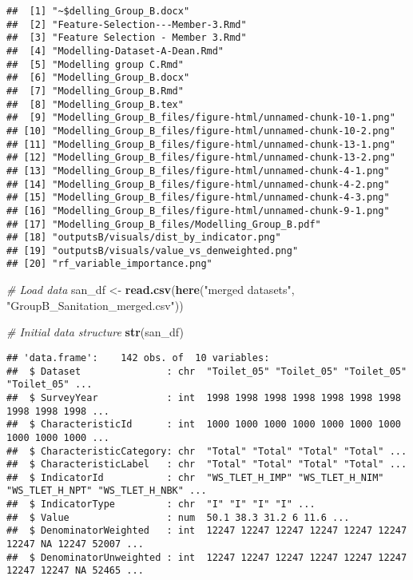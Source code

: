 \documentclass[
]{article}
\newenvironment{Shaded}{\begin{snugshade}}{\end{snugshade}}
\newcommand{\CommentTok}[1]{\textcolor[rgb]{0.56,0.35,0.01}{\textit{#1}}}
\newcommand{\FunctionTok}[1]{\textcolor[rgb]{0.13,0.29,0.53}{\textbf{#1}}}
\newcommand{\NormalTok}[1]{#1}
\newcommand{\OtherTok}[1]{\textcolor[rgb]{0.56,0.35,0.01}{#1}}
\newcommand{\StringTok}[1]{\textcolor[rgb]{0.31,0.60,0.02}{#1}}
\begin{document}
\begin{verbatim}
##  [1] "~$delling_Group_B.docx"                                    
##  [2] "Feature-Selection---Member-3.Rmd"                          
##  [3] "Feature Selection - Member 3.Rmd"                          
##  [4] "Modelling-Dataset-A-Dean.Rmd"                              
##  [5] "Modelling group C.Rmd"                                     
##  [6] "Modelling_Group_B.docx"                                    
##  [7] "Modelling_Group_B.Rmd"                                     
##  [8] "Modelling_Group_B.tex"                                     
##  [9] "Modelling_Group_B_files/figure-html/unnamed-chunk-10-1.png"
## [10] "Modelling_Group_B_files/figure-html/unnamed-chunk-10-2.png"
## [11] "Modelling_Group_B_files/figure-html/unnamed-chunk-13-1.png"
## [12] "Modelling_Group_B_files/figure-html/unnamed-chunk-13-2.png"
## [13] "Modelling_Group_B_files/figure-html/unnamed-chunk-4-1.png" 
## [14] "Modelling_Group_B_files/figure-html/unnamed-chunk-4-2.png" 
## [15] "Modelling_Group_B_files/figure-html/unnamed-chunk-4-3.png" 
## [16] "Modelling_Group_B_files/figure-html/unnamed-chunk-9-1.png" 
## [17] "Modelling_Group_B_files/Modelling_Group_B.pdf"             
## [18] "outputsB/visuals/dist_by_indicator.png"                    
## [19] "outputsB/visuals/value_vs_denweighted.png"                 
## [20] "rf_variable_importance.png"
\end{verbatim}

\begin{Shaded}
\begin{Highlighting}[]
\CommentTok{\# Load data}
\NormalTok{san\_df }\OtherTok{\textless{}{-}} \FunctionTok{read.csv}\NormalTok{(}\FunctionTok{here}\NormalTok{(}\StringTok{"merged datasets"}\NormalTok{, }\StringTok{"GroupB\_Sanitation\_merged.csv"}\NormalTok{))}

\CommentTok{\# Initial data structure}
\FunctionTok{str}\NormalTok{(san\_df)}
\end{Highlighting}
\end{Shaded}

\begin{verbatim}
## 'data.frame':    142 obs. of  10 variables:
##  $ Dataset               : chr  "Toilet_05" "Toilet_05" "Toilet_05" "Toilet_05" ...
##  $ SurveyYear            : int  1998 1998 1998 1998 1998 1998 1998 1998 1998 1998 ...
##  $ CharacteristicId      : int  1000 1000 1000 1000 1000 1000 1000 1000 1000 1000 ...
##  $ CharacteristicCategory: chr  "Total" "Total" "Total" "Total" ...
##  $ CharacteristicLabel   : chr  "Total" "Total" "Total" "Total" ...
##  $ IndicatorId           : chr  "WS_TLET_H_IMP" "WS_TLET_H_NIM" "WS_TLET_H_NPT" "WS_TLET_H_NBK" ...
##  $ IndicatorType         : chr  "I" "I" "I" "I" ...
##  $ Value                 : num  50.1 38.3 31.2 6 11.6 ...
##  $ DenominatorWeighted   : int  12247 12247 12247 12247 12247 12247 12247 NA 12247 52007 ...
##  $ DenominatorUnweighted : int  12247 12247 12247 12247 12247 12247 12247 12247 NA 52465 ...
\end{verbatim}
\end{document}
